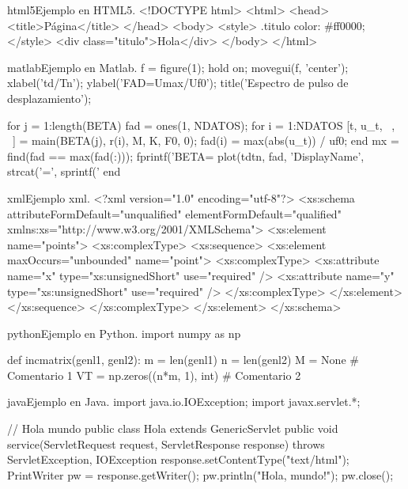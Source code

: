 \begin{sourcecode}[\label{codigo-html5}]{html5}{Ejemplo en HTML5.}
<!DOCTYPE html>
<html>
<head>
	<title>Página</title>
</head>
<body>
	<style>
		.titulo {
			color: #ff0000;
		}
	</style>
	<div class="titulo">Hola</div>
</body>
</html>
\end{sourcecode}

\begin{sourcecode}[\label{codigo-matlab}]{matlab}{Ejemplo en Matlab.}
f = figure(1);
hold on;
movegui(f, 'center');
xlabel('td/Tn'); ylabel('FAD=Umax/Uf0');
title('Espectro de pulso de desplazamiento');

for j = 1:length(BETA)
	fad = ones(1, NDATOS); %
	for i = 1:NDATOS
		[t, u_t, ~, ~] = main(BETA(j), r(i), M, K, F0, 0);
		fad(i) = max(abs(u_t)) / uf0;
	end
mx = find(fad == max(fad(:)));
fprintf('BETA=%
plot(tdtn, fad, 'DisplayName', strcat('\beta=', sprintf('%
end	
\end{sourcecode}

\begin{sourcecode}[]{xml}{Ejemplo xml.}
<?xml version="1.0" encoding="utf-8"?>
<xs:schema attributeFormDefault="unqualified" elementFormDefault="qualified"
xmlns:xs="http://www.w3.org/2001/XMLSchema">
	<xs:element name="points">
		<xs:complexType>
			<xs:sequence>
				<xs:element maxOccurs="unbounded" name="point">
					<xs:complexType>
						<xs:attribute name="x" type="xs:unsignedShort" use="required" />
						<xs:attribute name="y" type="xs:unsignedShort" use="required" />
					</xs:complexType>
				</xs:element>
			</xs:sequence>
		</xs:complexType>
	</xs:element>
</xs:schema>
\end{sourcecode}

\begin{sourcecode}[\label{codigo-python}]{python}{Ejemplo en Python.}
import numpy as np

def incmatrix(genl1, genl2):
m = len(genl1)
n = len(genl2)
M = None # Comentario 1
VT = np.zeros((n*m, 1), int) # Comentario 2
\end{sourcecode}

\begin{sourcecode}[\label{codigo-java}]{java}{Ejemplo en Java.}
import java.io.IOException; 
import javax.servlet.*;

// Hola mundo
public class Hola extends GenericServlet {
	public void service(ServletRequest request, ServletResponse response)
	throws ServletException, IOException{
		response.setContentType("text/html");
		PrintWriter pw = response.getWriter();
		pw.println("Hola, mundo!");
		pw.close();
	}
}
\end{sourcecode}

